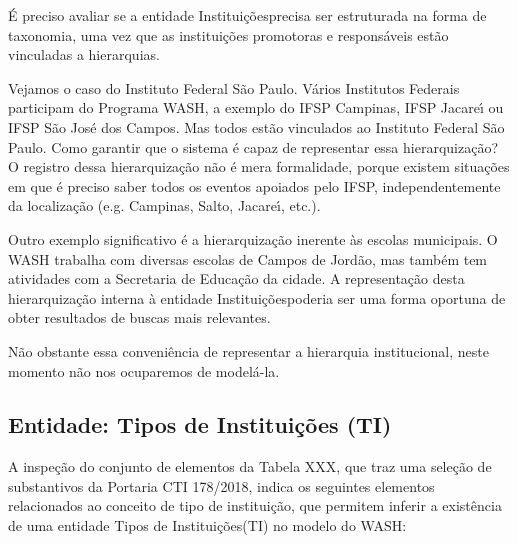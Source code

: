 \documentclass[
12pt,		%
openright,	%
twoside,  %
a4paper,			%
chapter=TITLE,		%
english,			%
french,				%
spanish,			%
brazil				%
]{USPSC-classe/USPSC}
\begin{document}
\'E preciso avaliar se a entidade \textquotedbl Institui\c{c}\~oes\textquotedbl  precisa ser estruturada na forma de taxonomia, uma vez que as institui\c{c}\~oes promotoras e respons\'aveis est\~ao vinculadas a hierarquias.









Vejamos o caso do Instituto Federal S\~ao Paulo. V\'arios Institutos Federais participam do Programa WASH, a exemplo do IFSP Campinas, IFSP Jacare\'{\i} ou IFSP S\~ao Jos\'e dos Campos. Mas todos est\~ao vinculados ao Instituto Federal S\~ao Paulo. Como garantir que o sistema \'e capaz de representar essa hierarquiza\c{c}\~ao? O registro dessa hierarquiza\c{c}\~ao n\~ao \'e mera formalidade, porque existem situa\c{c}\~oes em que \'e preciso saber todos os eventos apoiados pelo IFSP, independentemente da localiza\c{c}\~ao (e.g. Campinas, Salto, Jacare\'{\i}, etc.).









Outro exemplo significativo \'e a hierarquiza\c{c}\~ao inerente \`as escolas municipais. O WASH trabalha com diversas escolas de Campos de Jord\~ao, mas tamb\'em tem atividades com a Secretaria de Educa\c{c}\~ao da cidade. A representa\c{c}\~ao desta hierarquiza\c{c}\~ao interna \`a entidade \textquotedbl Institui\c{c}\~oes\textquotedbl  poderia ser uma forma oportuna de obter resultados de buscas mais relevantes.









N\~ao obstante essa conveni\^encia de representar a hierarquia institucional, neste momento n\~ao nos ocuparemos de model\'a-la.









\subsection[Entidade: Tipos de Institui\c{c}\~oes (TI)]{Entidade: Tipos de Institui\c{c}\~oes (TI)}\label{Entidade: Tipos de Institui\c{c}\~oes (TI)}
A inspe\c{c}\~ao do conjunto de elementos da Tabela XXX, que traz uma sele\c{c}\~ao de substantivos da Portaria CTI 178/2018, indica os seguintes elementos relacionados ao conceito de \textquotedbl tipo de institui\c{c}\~ao\textquotedbl , que permitem inferir a exist\^encia de uma entidade \textquotedbl Tipos de Institui\c{c}\~oes\textquotedbl  (TI) no modelo do WASH:
\end{document}
